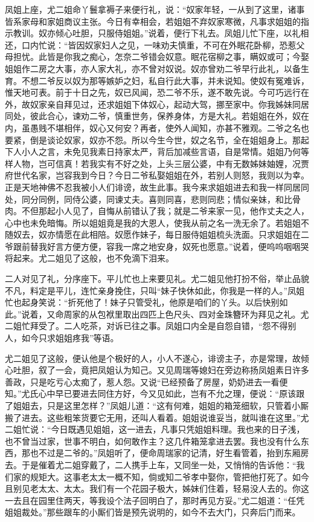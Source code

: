 \documentclass[12pt,oneside]{book}
\begin{document}
凤姐上座，尤二姐命丫鬟拿褥子来便行礼，说：“奴家年轻，一从到了这里，诸事皆系家母和家姐商议主张。今日有幸相会，若姐姐不弃奴家寒微，凡事求姐姐的指示教训。奴亦倾心吐胆，只服侍姐姐。”说着，便行下礼去。凤姐儿忙下座，以礼相还，口内忙说：“皆因奴家妇人之见，一味劝夫慎重，不可在外眠花卧柳，恐惹父母担忧。此皆是你我之痴心，怎奈二爷错会奴意。眠花宿柳之事，瞒奴或可；今娶姐姐作二房之大事，亦人家大礼，亦不曾对奴说。奴亦曾劝二爷早行此礼，以备生育。不想二爷反以奴为那等嫉妒之妇，私自行此大事，并未说知。使奴有冤难诉，惟天地可表。前于十日之先，奴已风闻，恐二爷不乐，遂不敢先说。今可巧远行在外，故奴家亲自拜见过，还求姐姐下体奴心，起动大驾，挪至家中。你我姊妹同居同处，彼此合心，谏劝二爷，慎重世务，保养身体，方是大礼。若姐姐在外，奴在内，虽愚贱不堪相伴，奴心又何安？再者，使外人闻知，亦甚不雅观。二爷之名也要紧，倒是谈论奴家，奴亦不怨。所以今生今世，奴之名节，全在姐姐身上。那起下人小人之言，未免见我素日持家太严，背后加减些言语，自是常情。姐姐乃何等样人物，岂可信真！若我实有不好之处，上头三层公婆，中有无数姊妹妯娌，况贾府世代名家，岂容我到今日？今日二爷私娶姐姐在外，若别人则怒，我则以为幸。正是天地神佛不忍我被小人们诽谤，故生此事。我今来求姐姐进去和我一样同居同处，同分同例，同侍公婆，同谏丈夫。喜则同喜，悲则同悲；情似亲妹，和比骨肉。不但那起小人见了，自悔从前错认了我；就是二爷来家一见，他作丈夫之人，心中也未免暗悔。所以姐姐竟是我的大恩人，使我从前之名一洗无余了。若姐姐不随奴去，奴亦情愿在此相陪。奴愿作妹子，每日服侍姐姐梳头洗面。只求姐姐在二爷跟前替我好言方便方便，容我一席之地安身，奴死也愿意。”说着，便呜呜咽咽哭将起来。尤二姐见了这般，也不免滴下泪来。

二人对见了礼，分序座下。平儿忙也上来要见礼。尤二姐见他打扮不俗，举止品貌不凡，料定是平儿，连忙亲身挽住，只叫“妹子快休如此，你我是一样的人。”凤姐忙也起身笑说：“折死他了！妹子只管受礼，他原是咱们的丫头。以后快别如此。”说着，又命周家的从包袱里取出四匹上色尺头、四对金珠簪环为拜见之礼。尤二姐忙拜受了。二人吃茶，对诉已往之事。凤姐口内全是自怨自错，“怨不得别人，如今只求姐姐疼我”等语。

尤二姐见了这般，便认他是个极好的人，小人不遂心，诽谤主子，亦是常理，故倾心吐胆，叙了一会，竟把凤姐认为知己。又见周瑞等媳妇在旁边称扬凤姐素日许多善政，只是吃亏心太痴了，惹人怨。又说“已经预备了房屋，奶奶进去一看便知。”尤氏心中早已要进去同住方好，今又见如此，岂有不允之理，便说：“原该跟了姐姐去，只是这里怎样？”凤姐儿道：“这有何难，姐姐的箱笼细软，只管着小厮搬了进去。这些粗笨货要它无用，还叫人看着。姐姐说谁妥当，就叫谁在这里。”尤二姐忙说：“今日既遇见姐姐，这一进去，凡事只凭姐姐料理。我也来的日子浅，也不曾当过家，世事不明白，如何敢作主？这几件箱笼拿进去罢。我也没有什么东西，那也不过是二爷的。”凤姐听了，便命周瑞家的记清，好生看管着，抬到东厢房去。于是催着尤二姐穿戴了，二人携手上车，又同坐一处，又悄悄的告诉他：“我们家的规矩大。这事老太太一概不知，倘或知二爷孝中娶你，管把他打死了。如今且别见老太太、太太。我们有一个花园子极大，姊妹们住着，轻易没人去的。你这一去且在园里住两天，等我设个法子回明白了，那时再见方妥。”尤二姐道：“任凭姐姐裁处。”那些跟车的小厮们皆是预先说明的，如今不去大门，只奔后门而来。
\end{document}
